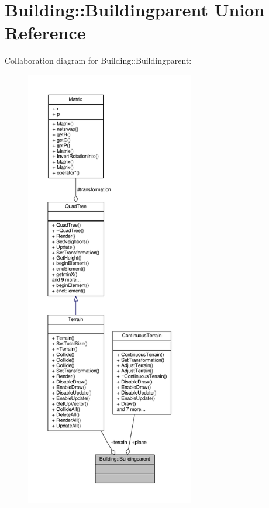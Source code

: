 \hypertarget{unionBuilding_1_1Buildingparent}{}\section{Building\+:\+:Buildingparent Union Reference}
\label{unionBuilding_1_1Buildingparent}


Collaboration diagram for Building\+:\+:Buildingparent\+:
\nopagebreak
\begin{figure}[H]
\begin{center}
\leavevmode
\includegraphics[height=550pt]{d0/da8/unionBuilding_1_1Buildingparent__coll__graph}
\end{center}
\end{figure}

